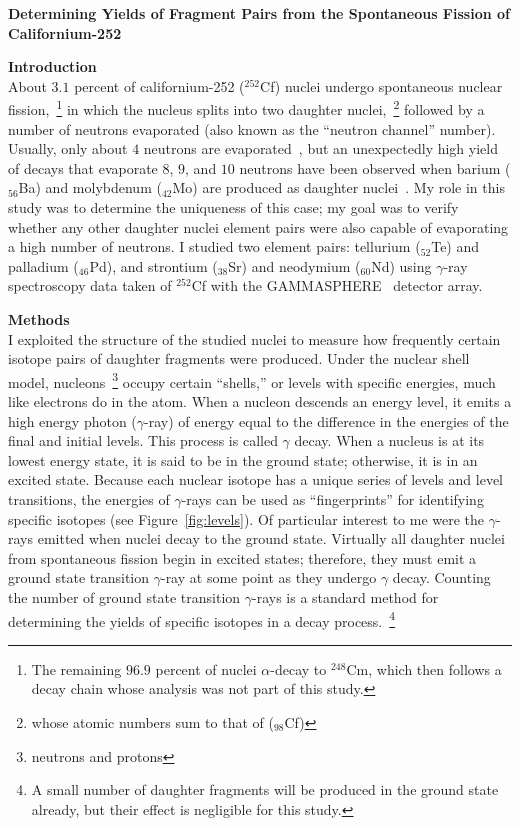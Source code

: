 \documentclass[12pt, letterpaper, twocolumn]{article}
\begin{document}
\begin{center}
\textbf{Determining Yields of Fragment Pairs from the Spontaneous Fission of Californium-252}
\end{center}

\noindent\textbf{Introduction}\\
About $3.1$ percent of californium-252 ($^{252}$Cf) nuclei undergo spontaneous nuclear fission,~\footnote{The remaining $96.9$ percent of nuclei $\alpha$-decay to $^{248}$Cm, which then follows a decay chain whose analysis was not part of this study.} in which the nucleus splits into two daughter nuclei,~\footnote{whose atomic numbers sum to that of ($_{98}$Cf)} followed by a number of neutrons evaporated (also known as the ``neutron channel'' number). Usually, only about $4$ neutrons are evaporated~\cite{osti_15053}, but an unexpectedly high yield of decays that evaporate $8$, $9$, and $10$ neutrons have been observed when barium ($_{56}$Ba) and molybdenum ($_{42}$Mo) are produced as daughter nuclei~\cite{PhysRevC.62.041601}. My role in this study was to determine the uniqueness of this case; my goal was to verify whether any other daughter nuclei element pairs were also capable of evaporating a high number of neutrons. I studied two element pairs: tellurium ($_{52}$Te) and palladium ($_{46}$Pd), and strontium ($_{38}$Sr) and neodymium ($_{60}$Nd) using $\gamma$-ray spectroscopy data taken of $^{252}$Cf with the GAMMASPHERE~\cite{LEE1990c641} detector array.

\vspace{0.125in}
\noindent\textbf{Methods}\\
I exploited the structure of the studied nuclei to measure how frequently certain isotope pairs of daughter fragments were produced. Under the nuclear shell model, nucleons~\footnote{neutrons and protons} occupy certain ``shells,'' or levels with specific energies, much like electrons do in the atom. When a nucleon descends an energy level, it emits a high energy photon ($\gamma$-ray) of energy equal to the difference in the energies of the final and initial levels. This process is called $\gamma$ decay. When a nucleus is at its lowest energy state, it is said to be in the ground state; otherwise, it is in an excited state.
Because each nuclear isotope has a unique series of levels and level transitions, the energies of $\gamma$-rays can be used as ``fingerprints'' for identifying specific isotopes (see Figure~\ref{fig:levels}). Of particular interest to me were the $\gamma$-rays emitted when nuclei decay to the ground state. Virtually all daughter nuclei from spontaneous fission begin in excited states; therefore, they must emit a ground state transition $\gamma$-ray at some point as they undergo $\gamma$ decay. Counting the number of ground state transition $\gamma$-rays is a standard method for determining the yields of specific isotopes in a decay process.~\footnote{A small number of daughter fragments will be produced in the ground state already, but their effect is negligible for this study.}
\end{document}

